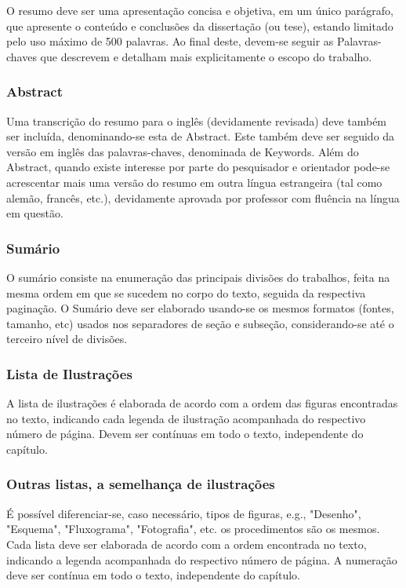 \documentclass[repeatfields,xlists,xpacks,oneside,yearsonly]{ufrgscca}
\begin{document}
O resumo deve ser uma apresentação concisa e objetiva, em um único
parágrafo, que apresente o conteúdo e conclusões da dissertação (ou tese),
estando limitado pelo uso máximo de 500 palavras. Ao final deste, devem-se
seguir as Palavras-chaves que descrevem e detalham mais explicitamente o
escopo do trabalho.

\subsubsection{Abstract}

Uma transcrição do resumo para o inglês (devidamente revisada) deve também
ser incluída, denominando-se esta de Abstract. Este também deve ser seguido
da versão em inglês das palavras-chaves, denominada de Keywords. Além do
Abstract, quando existe interesse por parte do pesquisador e orientador
pode-se acrescentar mais uma versão do resumo em outra língua estrangeira
(tal como alemão, francês, etc.), devidamente aprovada por professor com
fluência na língua em questão.

\subsubsection{Sumário}

O sumário consiste na enumeração das principais divisões do trabalhos, feita
na mesma ordem em que se sucedem no corpo do texto, seguida da respectiva
paginação. O Sumário deve ser elaborado usando-se os mesmos formatos
(fontes, tamanho, etc) usados nos separadores de seção e subseção,
considerando-se até o terceiro nível de divisões.

\subsubsection{Lista de Ilustrações}

A lista de ilustrações é elaborada de acordo com a ordem das figuras
encontradas no texto, indicando cada legenda de ilustração acompanhada do
respectivo número de página. Devem ser contínuas em todo o texto,
independente do capítulo.

\subsubsection{Outras listas, a semelhança de ilustrações}

É possível diferenciar-se, caso necessário, tipos de figuras, e.g., "Desenho", "Esquema", "Fluxograma", "Fotografia", etc. os procedimentos são os mesmos.
Cada lista deve ser  elaborada de acordo com a ordem encontrada no texto,
indicando a legenda  acompanhada do
respectivo número de página. A numeração deve ser contínua em todo o texto,
independente do capítulo.
\end{document}

